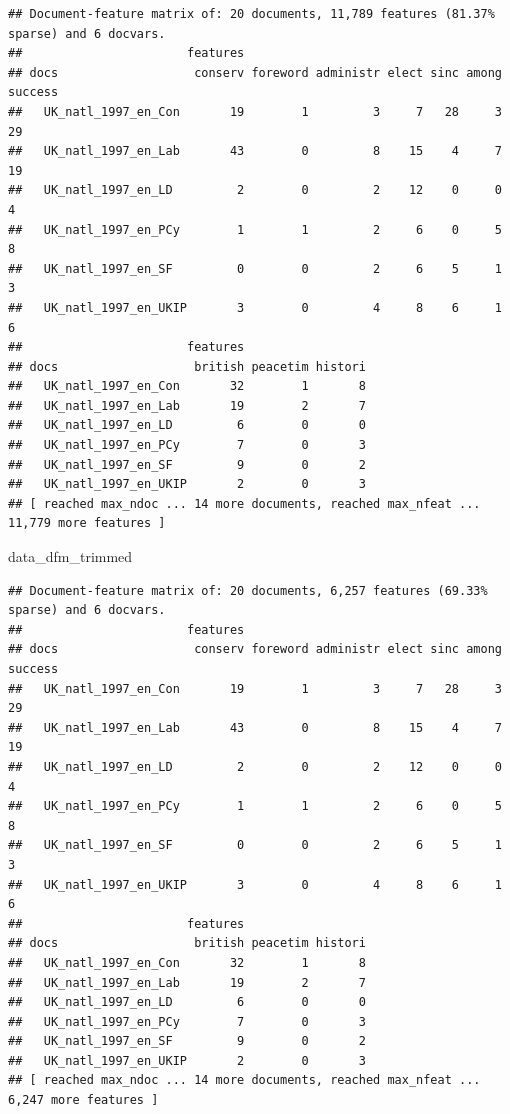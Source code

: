 \documentclass[
]{book}
\newenvironment{Shaded}{\begin{snugshade}}{\end{snugshade}}
\newcommand{\NormalTok}[1]{#1}
\begin{document}
\begin{verbatim}
## Document-feature matrix of: 20 documents, 11,789 features (81.37% sparse) and 6 docvars.
##                       features
## docs                   conserv foreword administr elect sinc among success
##   UK_natl_1997_en_Con       19        1         3     7   28     3      29
##   UK_natl_1997_en_Lab       43        0         8    15    4     7      19
##   UK_natl_1997_en_LD         2        0         2    12    0     0       4
##   UK_natl_1997_en_PCy        1        1         2     6    0     5       8
##   UK_natl_1997_en_SF         0        0         2     6    5     1       3
##   UK_natl_1997_en_UKIP       3        0         4     8    6     1       6
##                       features
## docs                   british peacetim histori
##   UK_natl_1997_en_Con       32        1       8
##   UK_natl_1997_en_Lab       19        2       7
##   UK_natl_1997_en_LD         6        0       0
##   UK_natl_1997_en_PCy        7        0       3
##   UK_natl_1997_en_SF         9        0       2
##   UK_natl_1997_en_UKIP       2        0       3
## [ reached max_ndoc ... 14 more documents, reached max_nfeat ... 11,779 more features ]
\end{verbatim}

\begin{Shaded}
\begin{Highlighting}[]
\NormalTok{data\_dfm\_trimmed}
\end{Highlighting}
\end{Shaded}

\begin{verbatim}
## Document-feature matrix of: 20 documents, 6,257 features (69.33% sparse) and 6 docvars.
##                       features
## docs                   conserv foreword administr elect sinc among success
##   UK_natl_1997_en_Con       19        1         3     7   28     3      29
##   UK_natl_1997_en_Lab       43        0         8    15    4     7      19
##   UK_natl_1997_en_LD         2        0         2    12    0     0       4
##   UK_natl_1997_en_PCy        1        1         2     6    0     5       8
##   UK_natl_1997_en_SF         0        0         2     6    5     1       3
##   UK_natl_1997_en_UKIP       3        0         4     8    6     1       6
##                       features
## docs                   british peacetim histori
##   UK_natl_1997_en_Con       32        1       8
##   UK_natl_1997_en_Lab       19        2       7
##   UK_natl_1997_en_LD         6        0       0
##   UK_natl_1997_en_PCy        7        0       3
##   UK_natl_1997_en_SF         9        0       2
##   UK_natl_1997_en_UKIP       2        0       3
## [ reached max_ndoc ... 14 more documents, reached max_nfeat ... 6,247 more features ]
\end{verbatim}
\end{document}
